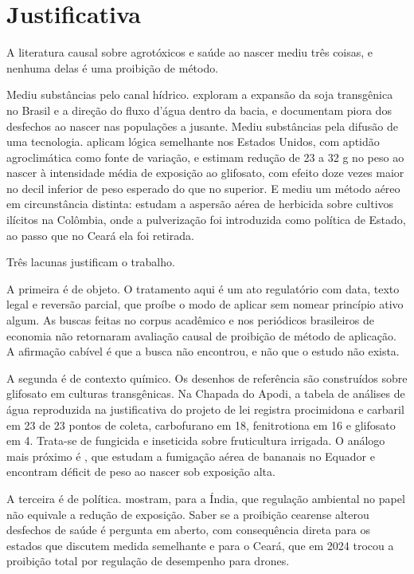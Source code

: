\section{Justificativa}
\label{sec:justificativa}

A literatura causal sobre agrotóxicos e saúde ao nascer mediu três coisas, e
nenhuma delas é uma proibição de método.

Mediu substâncias pelo canal hídrico. \citet{dias2023down} exploram a
expansão da soja transgênica no Brasil e a direção do fluxo d'água dentro da
bacia, e documentam piora dos desfechos ao nascer nas populações a jusante.
Mediu substâncias pela difusão de uma tecnologia. \citet{reynier2025glyphosate}
aplicam lógica semelhante nos Estados Unidos, com aptidão agroclimática como
fonte de variação, e estimam redução de 23 a 32 g no peso ao nascer à
intensidade média de exposição ao glifosato, com efeito doze vezes maior no
decil inferior de peso esperado do que no superior. E mediu um método aéreo em
circunstância distinta: \citet{camacho2017health} estudam a aspersão aérea de
herbicida sobre cultivos ilícitos na Colômbia, onde a pulverização foi
introduzida como política de Estado, ao passo que no Ceará ela foi retirada.

Três lacunas justificam o trabalho.

A primeira é de objeto. O tratamento aqui é um ato regulatório com data, texto
legal e reversão parcial, que proíbe o modo de aplicar sem nomear princípio
ativo algum. As buscas feitas no corpus acadêmico e nos periódicos brasileiros
de economia não retornaram avaliação causal de proibição de método de
aplicação. A afirmação cabível é que a busca não encontrou, e não que o estudo
não exista.

A segunda é de contexto químico. Os desenhos de referência são construídos
sobre glifosato em culturas transgênicas. Na Chapada do Apodi, a tabela de
análises de água reproduzida na justificativa do projeto de lei registra
procimidona e carbaril em 23 de 23 pontos de coleta, carbofurano em 18,
fenitrotiona em 16 e glifosato em 4. Trata-se de fungicida e inseticida sobre
fruticultura irrigada. O análogo mais próximo é \citet{calzada2023bananas}, que
estudam a fumigação aérea de bananais no Equador e encontram déficit de peso ao
nascer sob exposição alta.

A terceira é de política. \citet{greenstone2014india} mostram, para a Índia,
que regulação ambiental no papel não equivale a redução de exposição. Saber se
a proibição cearense alterou desfechos de saúde é pergunta em aberto, com
consequência direta para os estados que discutem medida semelhante e para o
Ceará, que em 2024 trocou a proibição total por regulação de desempenho para
drones.

